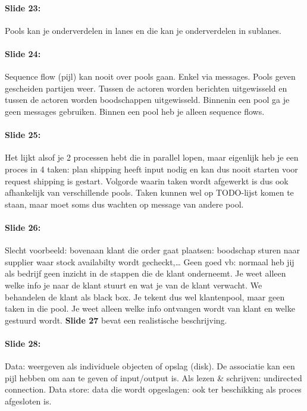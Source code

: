 \documentclass[10pt,a4paper]{report}
\begin{document}
\paragraph{Slide 23:}Pools kan je onderverdelen in lanes en die kan je onderverdelen in sublanes.

\paragraph{Slide 24:}Sequence flow (pijl) kan nooit over pools gaan. Enkel via messages.
Pools geven gescheiden partijen weer. Tussen de actoren worden berichten uitgewisseld en tussen de actoren worden boodschappen uitgewisseld. Binnenin een pool ga je geen messages gebruiken. Binnen een pool heb je alleen sequence flows.

\paragraph{Slide 25:}Het lijkt alsof je 2 processen hebt die in parallel lopen, maar eigenlijk heb je een proces in 4 taken: plan shipping heeft input nodig en kan dus nooit starten voor request shipping is gestart. Volgorde waarin taken wordt afgewerkt is dus ook afhankelijk van verschillende pools. Taken kunnen wel op TODO-lijst komen te staan, maar moet soms dus wachten op message van andere pool. 

\paragraph{Slide 26:}Slecht voorbeeld: bovenaan klant die order gaat plaatsen: boodschap sturen naar supplier waar stock availabilty wordt gecheckt,…
Geen goed vb: normaal heb jij als bedrijf geen inzicht in de stappen die de klant onderneemt. Je weet alleen welke info je naar de klant stuurt en wat je van de klant verwacht. We behandelen de klant als black box. Je tekent dus wel klantenpool, maar geen taken in die pool. Je weet alleen welke info ontvangen wordt van klant en welke gestuurd wordt. \textbf{Slide 27} bevat een realistische beschrijving.

\paragraph{Slide 28:}Data: weergeven als  individuele objecten of opslag (disk). De associatie kan een pijl hebben om aan te geven of input/output is. Als lezen \& schrijven: undirected connection.
Data store: data die wordt opgeslagen: ook ter beschikking als proces afgesloten is.
\end{document}
